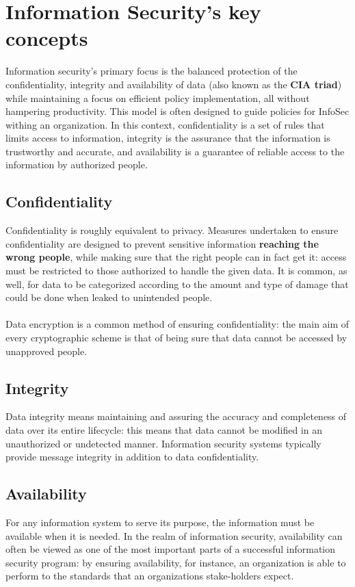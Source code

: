 \documentclass[Lau,binding=0.6cm,oneside]{sapthesis}
\begin{document}
\section{Information Security's key concepts}
Information security's primary focus is the balanced protection of the confidentiality, integrity and availability of data (also known as the \textbf{CIA triad}) while maintaining a focus on efficient policy implementation, all without hampering productivity. This model is often designed to guide policies for InfoSec withing an organization. In this context, confidentiality is a set of rules that limits access to information, integrity is the assurance that the information is trustworthy and accurate, and availability is a guarantee of reliable access to the information by authorized people.

\subsection{Confidentiality}
Confidentiality is roughly equivalent to privacy. Measures undertaken to ensure confidentiality are designed to prevent sensitive information \textbf{reaching the wrong people}, while making sure that the right people can in fact get it: access must be restricted to those authorized to handle the given data. It is common, as well, for data to be categorized according to the amount and type of damage that could be done when leaked to unintended people\supercite{confidentiality}.\\\\
Data encryption is a common method of ensuring confidentiality: the main aim of every cryptographic scheme is that of being sure that data cannot be accessed by unapproved people.

\subsection{Integrity}
Data integrity means maintaining and assuring the accuracy and completeness of data over its entire lifecycle: this means that data cannot be modified in an unauthorized or undetected manner\supercite{integrity}. Information security systems typically provide message integrity in addition to data confidentiality.

\subsection{Availability}
For any information system to serve its purpose, the information must be available when it is needed. In the realm of information security, availability can often be viewed as one of the most important parts of a successful information security program: by ensuring availability, for instance, an organization is able to perform to the standards that an organizations stake-holders expect.
\end{document}
